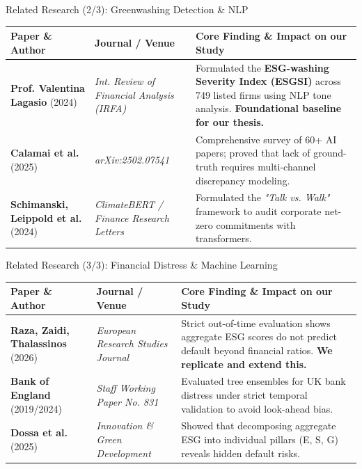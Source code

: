 \documentclass[aspectratio=169,10pt]{beamer}
\begin{document}
\begin{frame}[t]{Related Research (2/3): Greenwashing Detection \& NLP}
\small
\begin{tabular}{@{}p{3.2cm}p{4.2cm}p{6.8cm}@{}}
\toprule
\textbf{Paper \& Author} & \textbf{Journal / Venue} & \textbf{Core Finding \& Impact on our Study} \\
\midrule
\textbf{Prof. Valentina Lagasio} (2024) & \emph{Int. Review of Financial Analysis (IRFA)} & Formulated the \textbf{ESG-washing Severity Index (ESGSI)} across 749 listed firms using NLP tone analysis. \textbf{Foundational baseline for our thesis.} \\
\addlinespace
\textbf{Calamai et al.} (2025) & \emph{arXiv:2502.07541} & Comprehensive survey of 60+ AI papers; proved that lack of ground-truth requires multi-channel discrepancy modeling. \\
\addlinespace
\textbf{Schimanski, Leippold et al.} (2024) & \emph{ClimateBERT / Finance Research Letters} & Formulated the \textit{"Talk vs. Walk"} framework to audit corporate net-zero commitments with transformers. \\
\bottomrule
\end{tabular}
\end{frame}

\begin{frame}[t]{Related Research (3/3): Financial Distress \& Machine Learning}
\small
\begin{tabular}{@{}p{3.2cm}p{4.2cm}p{6.8cm}@{}}
\toprule
\textbf{Paper \& Author} & \textbf{Journal / Venue} & \textbf{Core Finding \& Impact on our Study} \\
\midrule
\textbf{Raza, Zaidi, Thalassinos} (2026) & \emph{European Research Studies Journal} & Strict out-of-time evaluation shows aggregate ESG scores do not predict default beyond financial ratios. \textbf{We replicate and extend this.} \\
\addlinespace
\textbf{Bank of England} (2019/2024) & \emph{Staff Working Paper No. 831} & Evaluated tree ensembles for UK bank distress under strict temporal validation to avoid look-ahead bias. \\
\addlinespace
\textbf{Dossa et al.} (2025) & \emph{Innovation \& Green Development} & Showed that decomposing aggregate ESG into individual pillars (E, S, G) reveals hidden default risks. \\
\bottomrule
\end{tabular}
\end{frame}
\end{document}
